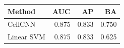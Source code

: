 \begin{tabular}{@{}lrrr@{}}
\toprule
Method & AUC & AP & BA \\
\midrule
CellCNN & 0.875 & 0.833 & 0.750 \\
Linear SVM & 0.875 & 0.833 & 0.625 \\
\bottomrule
\end{tabular}
